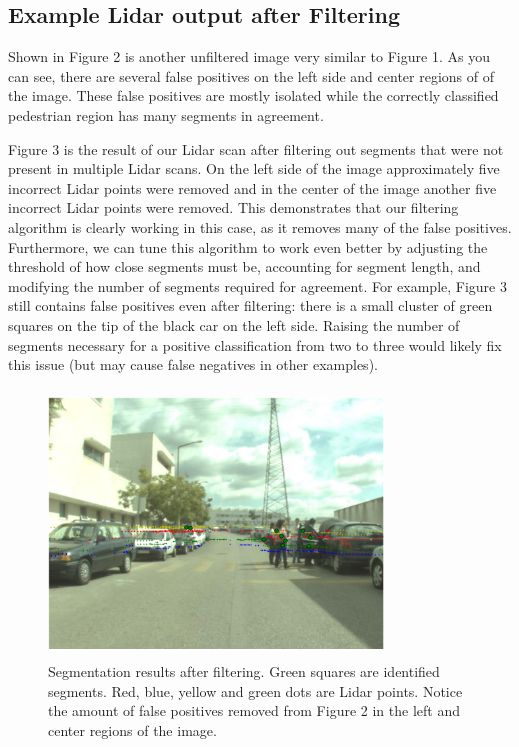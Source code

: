 \documentclass[10pt,twocolumn,letterpaper]{article}
\begin{document}
  \subsection{Example Lidar output after Filtering}

  Shown in Figure 2 is another unfiltered image very similar to Figure 1. As you can see,
  there are several false positives on the left side and center regions of of the image.
  These false positives are mostly isolated while the correctly classified pedestrian
  region has many segments in agreement.

  Figure 3 is the result of our Lidar scan after filtering out segments
  that were not present in multiple Lidar scans. On the left side of the image
  approximately five incorrect Lidar points were removed and in the center of
  the image another five incorrect Lidar points were removed. This demonstrates that
  our filtering algorithm is clearly working in this case, as it removes many
  of the false positives. Furthermore, we can tune this algorithm to work
  even better by adjusting the threshold of how close segments must be,
  accounting for segment length, and modifying the number of segments required for
  agreement. For example, Figure 3 still contains false positives even after filtering:
  there is a small cluster of green squares on the tip of the black car on the left
  side. Raising the number of segments necessary for a positive classification from two
  to three would likely fix this issue (but may cause false negatives in other examples).

  \begin{figure}
    \includegraphics[height=2.8in, width=3.5in]{images/filterSampleResults.png}
    \caption{ Segmentation results after filtering. Green squares are identified
    segments. Red, blue, yellow and green dots are Lidar points. Notice the
    amount of false positives removed from Figure 2 in the left and center
    regions of the image.}
  \end{figure}
\end{document}
